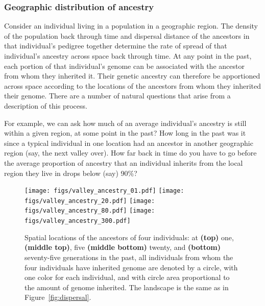 \documentclass{ar-1col}
\newcommand{\plr}[1]{{\color{green}{#1}}}
\newcommand{\todo}[1]{{\textbf{\color{red}{#1}}}}
\begin{document}
\subsubsection{Geographic distribution of ancestry}

Consider an individual living in a population in a geographic region.
The density of the population back through time and 
dispersal distance of the ancestors in that individual's pedigree 
together determine the rate of spread of that individual's ancestry 
across space back through time.
At any point in the past,
each portion of that individual's genome can be associated 
with the ancestor from whom they inherited it.
Their genetic ancestry can therefore be apportioned across space according
to the locations of the ancestors from whom they inherited their genome.
There are a number of natural questions that arise from a description of this process.

For example, we can ask how much of an average individual's ancestry is still within a given region, at some point in the past?
How long in the past was it since a typical individual in one location had an ancestor
in another geographic region (say, the next valley over).
How far back in time do you have to go before the average proportion of ancestry that an individual inherits
from the local region they live in drops below (say) 90\%?

\todo{tidy and conclude}

\begin{figure}[ht]
    \centering
        \texttt{[image: figs/valley\_ancestry\_01.pdf]}
        \texttt{[image: figs/valley\_ancestry\_20.pdf]}
        \texttt{[image: figs/valley\_ancestry\_80.pdf]}
        \texttt{[image: figs/valley\_ancestry\_300.pdf]}
        \caption{
            Spatial locations of the ancestors of four individuals:
            at 
            \textbf{(top)} one, 
            \textbf{(middle top)}, five
            \textbf{(middle bottom)} twenty, and
            \textbf{(bottom)} seventy-five generations in the past,
            all individuals from whom the four individuals have inherited genome are denoted by a circle,
            with one color for each individual,
            and with circle area proportional to the amount of genome inherited.
            The landscape is the same as in Figure~\ref{fig:dispersal}.
            \plr{this is too many: which ones to keep?}
        }
        \label{ancestry_spread}
\end{figure}
\end{document}
